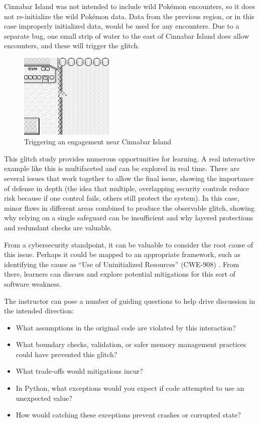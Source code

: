 \documentclass[letterpaper]{article}
\begin{document}
Cinnabar Island was not intended to include wild Pokémon encounters, so it does not re-initialize the wild Pokémon data. Data from the previous region, or in this case improperly initialized data, would be used for any encounters. Due to a separate bug, one small strip of water to the east of Cinnabar Island does allow encounters, and these will trigger the glitch.

\begin{figure}[h!]
    \centering
    \includegraphics[width=0.4\textwidth]{surfing.png}
    \caption{Triggering an engagement near Cinnabar Island}
\end{figure}

This glitch study provides numerous opportunities for learning. A real interactive example like this is multifaceted and can be explored in real time. There are several issues that work together to allow the final issue, showing the importance of defense in depth (the idea that multiple, overlapping security controls reduce risk because if one control fails, others still protect the system). In this case, minor flaws in different areas combined to produce the observable glitch, showing why relying on a single safeguard can be insufficient and why layered protections and redundant checks are valuable.

From a cybersecurity standpoint, it can be valuable to consider the root cause of this issue. Perhaps it could be mapped to an appropriate framework, such as identifying the cause as ``Use of Uninitialized Resources'' (CWE-908) \cite{mitre2012}. From there, learners can discuss and explore potential mitigations for this sort of software weakness.

The instructor can pose a number of guiding questions to help drive discussion in the intended direction:

\begin{itemize}
    \item What assumptions in the original code are violated by this interaction?
    \item What boundary checks, validation, or safer memory management practices could have prevented this glitch?
    \item What trade-offs would mitigations incur?
    \item In Python, what exceptions would you expect if code attempted to use an unexpected value?
    \item How would catching these exceptions prevent crashes or corrupted state?
\end{itemize}
\end{document}
